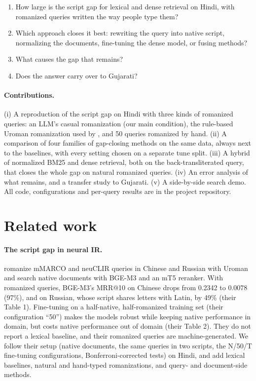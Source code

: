 \documentclass[11pt,a4paper]{article}
\begin{document}
\begin{enumerate}
  \item How large is the script gap for lexical and dense retrieval on Hindi, with romanized
        queries written the way people type them?
  \item Which approach closes it best: rewriting the query into native script,
        normalizing the documents, fine-tuning the dense model, or fusing methods?
  \item What causes the gap that remains?
  \item Does the answer carry over to Gujarati?
\end{enumerate}

\paragraph{Contributions.}
(i) A reproduction of the script gap on Hindi with three kinds of romanized queries: an LLM's
casual romanization (our main condition), the rule-based Uroman romanization used by
\citet{chari2025lost}, and 50 queries romanized by hand. (ii) A comparison of four families of
gap-closing methods on the same data, always next to the baselines, with every setting chosen
on a separate tune split. (iii) A hybrid of normalized BM25 and dense retrieval, both on the
back-transliterated query, that closes the whole gap on natural romanized queries. (iv) An
error analysis of what remains, and a transfer study to Gujarati. (v) A side-by-side search
demo. All code, configurations and per-query results are in the project repository.

\section{Related work}

\paragraph{The script gap in neural IR.}
\citet{chari2025lost} romanize mMARCO and neuCLIR queries in Chinese and Russian with Uroman
\citep{hermjakob2018uroman} and search native documents with BGE-M3 and an mT5 reranker. With
romanized queries, BGE-M3's MRR@10 on Chinese drops from 0.2342 to 0.0078 (97\%), and on
Russian, whose script shares letters with Latin, by 49\% (their Table 1). Fine-tuning on a
half-native, half-romanized training set (their configuration ``50'') makes the models robust
while keeping native performance in domain, but costs native performance out of domain (their
Table 2). They do not report a lexical baseline, and their romanized queries are
machine-generated. We follow their setup (native documents, the same queries in two scripts,
the N/50/T fine-tuning configurations, Bonferroni-corrected tests) on Hindi, and add lexical
baselines, natural and hand-typed romanizations, and query- and document-side methods.
\end{document}
